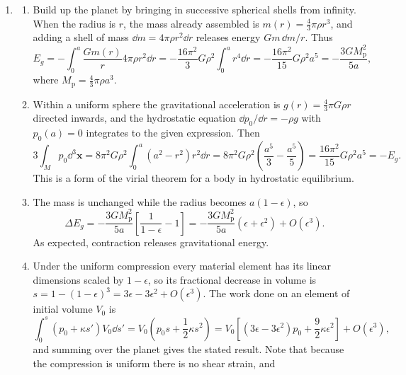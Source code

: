 \documentclass[a4paper,10pt]{paper}
\begin{document}
\begin{enumerate}
\item
\begin{enumerate}
\item Build up the planet by bringing in successive spherical shells from infinity. When the radius is $r$, the mass already
assembled is $m(r)=\tfrac{4}{3}\pi\rho r^{3}$, and adding a shell of mass $\dd m=4\pi\rho r^{2}\dd r$ releases energy $Gm\,\dd m/r$. Thus
\begin{equation*}
    E_{g}=-\int_{0}^{a}\frac{Gm(r)}{r}4\pi\rho r^{2}\dd r=-\frac{16\pi^{2}}{3}G\rho^{2}\int_{0}^{a}r^{4}\dd r=-\frac{16\pi^{2}}{15}G\rho^{2}a^{5}
    =-\frac{3GM_{\mathrm{p}}^{2}}{5a},
\end{equation*}
where $M_{\mathrm{p}}=\tfrac{4}{3}\pi\rho a^{3}$.
\item Within a uniform sphere the gravitational acceleration is $g(r)=\tfrac{4}{3}\pi G\rho r$ directed inwards, and the
hydrostatic equation $\dd p_{0}/\dd r=-\rho g$ with $p_{0}(a)=0$ integrates to the given expression. Then
\begin{equation*}
    3\int_{M}p_{0}\dd^{3}\mathbf{x}=8\pi^{2}G\rho^{2}\int_{0}^{a}(a^{2}-r^{2})r^{2}\dd r=8\pi^{2}G\rho^{2}\left(\frac{a^{5}}{3}-\frac{a^{5}}{5}\right)
    =\frac{16\pi^{2}}{15}G\rho^{2}a^{5}=-E_{g}.
\end{equation*}
This is a form of the virial theorem for a body in hydrostatic equilibrium.
\item The mass is unchanged while the radius becomes $a(1-\epsilon)$, so
\begin{equation*}
    \Delta E_{g}=-\frac{3GM_{\mathrm{p}}^{2}}{5a}\left[\frac{1}{1-\epsilon}-1\right]=-\frac{3GM_{\mathrm{p}}^{2}}{5a}(\epsilon+\epsilon^{2})+O(\epsilon^{3}).
\end{equation*}
As expected, contraction releases gravitational energy.
\item Under the uniform compression every material element has its linear dimensions scaled by $1-\epsilon$, so its
fractional decrease in volume is $s=1-(1-\epsilon)^{3}=3\epsilon-3\epsilon^{2}+O(\epsilon^{3})$. The work done on an element of
initial volume $V_{0}$ is
\begin{equation*}
    \int_{0}^{s}(p_{0}+\kappa s')V_{0}\dd s'=V_{0}\left(p_{0}s+\frac{1}{2}\kappa s^{2}\right)
    =V_{0}\left[(3\epsilon-3\epsilon^{2})p_{0}+\frac{9}{2}\kappa\epsilon^{2}\right]+O(\epsilon^{3}),
\end{equation*}
and summing over the planet gives the stated result. Note that because the compression is uniform there is no shear strain, and

\end{enumerate}
\end{enumerate}
\end{document}
